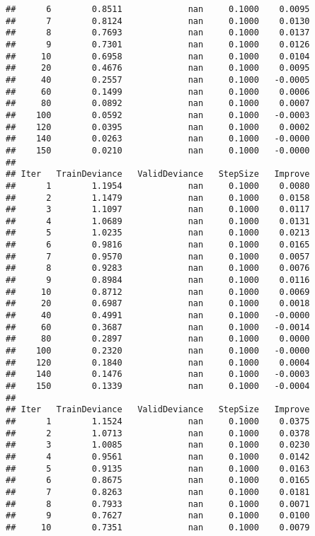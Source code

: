 \documentclass[]{article}
\begin{document}
\begin{verbatim}
##      6        0.8511             nan     0.1000    0.0095
##      7        0.8124             nan     0.1000    0.0130
##      8        0.7693             nan     0.1000    0.0137
##      9        0.7301             nan     0.1000    0.0126
##     10        0.6958             nan     0.1000    0.0104
##     20        0.4676             nan     0.1000    0.0095
##     40        0.2557             nan     0.1000   -0.0005
##     60        0.1499             nan     0.1000    0.0006
##     80        0.0892             nan     0.1000    0.0007
##    100        0.0592             nan     0.1000   -0.0003
##    120        0.0395             nan     0.1000    0.0002
##    140        0.0263             nan     0.1000   -0.0000
##    150        0.0210             nan     0.1000   -0.0000
## 
## Iter   TrainDeviance   ValidDeviance   StepSize   Improve
##      1        1.1954             nan     0.1000    0.0080
##      2        1.1479             nan     0.1000    0.0158
##      3        1.1097             nan     0.1000    0.0117
##      4        1.0689             nan     0.1000    0.0131
##      5        1.0235             nan     0.1000    0.0213
##      6        0.9816             nan     0.1000    0.0165
##      7        0.9570             nan     0.1000    0.0057
##      8        0.9283             nan     0.1000    0.0076
##      9        0.8984             nan     0.1000    0.0116
##     10        0.8712             nan     0.1000    0.0069
##     20        0.6987             nan     0.1000    0.0018
##     40        0.4991             nan     0.1000   -0.0000
##     60        0.3687             nan     0.1000   -0.0014
##     80        0.2897             nan     0.1000    0.0000
##    100        0.2320             nan     0.1000   -0.0000
##    120        0.1840             nan     0.1000    0.0004
##    140        0.1476             nan     0.1000   -0.0003
##    150        0.1339             nan     0.1000   -0.0004
## 
## Iter   TrainDeviance   ValidDeviance   StepSize   Improve
##      1        1.1524             nan     0.1000    0.0375
##      2        1.0713             nan     0.1000    0.0378
##      3        1.0085             nan     0.1000    0.0230
##      4        0.9561             nan     0.1000    0.0142
##      5        0.9135             nan     0.1000    0.0163
##      6        0.8675             nan     0.1000    0.0165
##      7        0.8263             nan     0.1000    0.0181
##      8        0.7933             nan     0.1000    0.0071
##      9        0.7627             nan     0.1000    0.0100
##     10        0.7351             nan     0.1000    0.0079

\end{verbatim}
\end{document}
